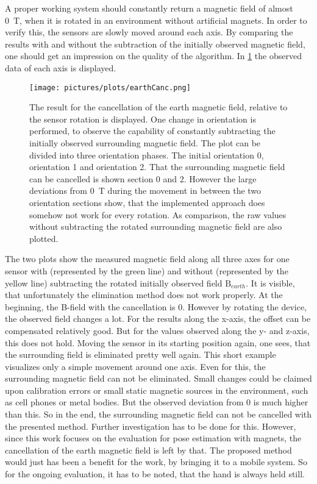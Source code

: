 A proper working system should constantly return a magnetic field of almost \SI{0}{\tesla}, when it is rotated in an environment without artificial magnets. In order to verify this, the sensors are slowly moved around each axis. By comparing the results with and without the subtraction of the initially observed magnetic field, one should get an impression on the quality of the algorithm. In \ref{fig:earthCancelRes} the observed data of each axis is displayed.

\begin{figure}[h]
\centering
\texttt{[image: pictures/plots/earthCanc.png]} 
\caption{The result for the cancellation of the earth magnetic field, relative to the sensor rotation is displayed. One change in orientation is performed, to observe the capability of constantly subtracting the initially observed surrounding magnetic field. The plot can be divided into three orientation phases. The initial orientation 0, orientation 1 and orientation 2. That the surrounding magnetic field can be cancelled is shown section 0 and 2. However the large deviations from \SI{0}{\tesla} during the movement in between the two orientation sections show, that the implemented approach does somehow not work for every rotation. As comparison, the raw values without subtracting the rotated surrounding magnetic field are also plotted.}
\label{fig:earthCancelRes}
\end{figure}

The two plots show the measured magnetic field along all three axes for one sensor with (represented by the green line) and without (represented by the yellow line) subtracting the rotated initially observed field $ \mathrm{B}_{earth} $. It is visible, that unfortunately the elimination method does not work properly. At the beginning, the B-field with the cancellation is 0. However by rotating the device, the observed field changes a lot. For the results along the x-axis, the offset can be compensated relatively good. But for the values observed along the y- and z-axis, this does not hold. Moving the sensor in its starting position again, one sees, that the surrounding field is eliminated pretty well again. This short example visualizes only a simple movement around one axis. Even for this, the surrounding magnetic field can not be eliminated. Small changes could be claimed upon calibration errors or small static magnetic sources in the environment, such as cell phones or metal bodies. But the observed deviation from 0 is much higher than this. So in the end, the surrounding magnetic field can not be cancelled with the presented method. Further investigation has to be done for this. However, since this work focuses on the evaluation for pose estimation with magnets, the cancellation of the earth magnetic field is left by that. The proposed method would just has been a benefit for the work, by bringing it to a mobile system. So for the ongoing evaluation, it has to be noted, that the hand is always held still. 




